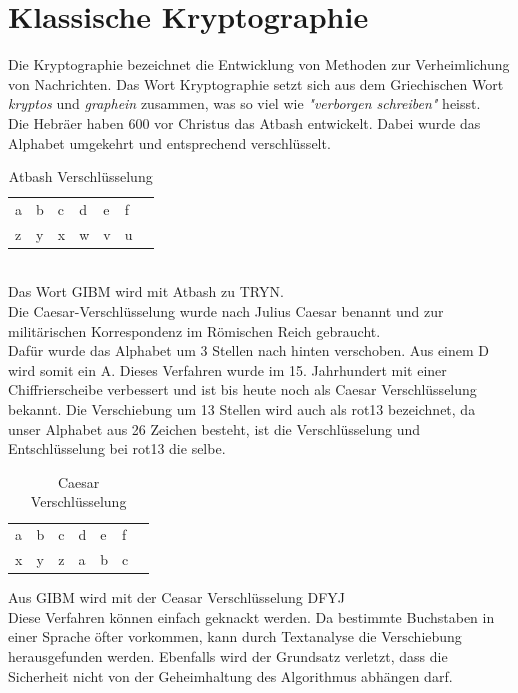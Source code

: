 \section{Klassische Kryptographie}
Die Kryptographie bezeichnet die Entwicklung von Methoden zur Verheimlichung von Nachrichten. Das Wort Kryptographie setzt sich aus dem Griechischen Wort \textit{kryptos} und \textit{graphein} zusammen, was so viel wie \textit{"verborgen schreiben"} heisst.  \cite{kryptographie_Grundlagen} \\
Die Hebräer haben 600 vor Christus das Atbash entwickelt. Dabei wurde das Alphabet umgekehrt und entsprechend verschlüsselt.
%
\begin{table}[ht]
\caption{Atbash Verschlüsselung}
\begin{center}
\begin{tabular}{|l|l|l|l|l|l|l|}
  a & b & c & d & e & f\\
  z & y & x & w & v & u\\
\end{tabular}
\end{center}
\end{table} \\
%
Das Wort GIBM wird mit Atbash zu TRYN.\\
Die Caesar-Verschlüsselung wurde nach Julius Caesar benannt und zur militärischen Korrespondenz im Römischen Reich gebraucht.\\
Dafür wurde das Alphabet um 3 Stellen nach hinten verschoben. Aus einem D wird somit ein A. Dieses Verfahren wurde im 15. Jahrhundert mit einer Chiffrierscheibe verbessert und ist bis heute noch als Caesar Verschlüsselung bekannt. Die Verschiebung um 13 Stellen wird auch als rot13 bezeichnet, da unser Alphabet aus 26 Zeichen besteht, ist die Verschlüsselung und Entschlüsselung bei rot13 die selbe. \\
%
\begin{table}[ht]
\caption{Caesar Verschlüsselung}
\begin{center}
\begin{tabular}{|l|l|l|l|l|l|l|}
  a & b & c & d & e & f\\
  x & y & z & a & b & c\\
\end{tabular}
\end{center}
\end{table}
%
Aus GIBM wird mit der Ceasar Verschlüsselung DFYJ \\
%
Diese Verfahren können einfach geknackt werden. Da bestimmte Buchstaben in einer Sprache öfter vorkommen, kann durch Textanalyse die Verschiebung herausgefunden werden. Ebenfalls wird der Grundsatz verletzt, dass die Sicherheit nicht von der Geheimhaltung des Algorithmus abhängen darf. \cite{kerckhoffsprinzip}
%
%
